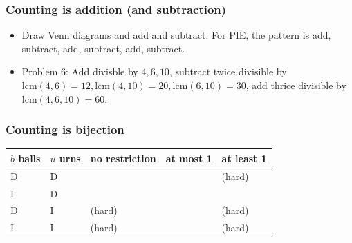 \documentclass[10pt,paper=letter]{scrartcl}
\begin{document}
\subsubsection*{Counting is addition (and subtraction)}

\begin{itemize}
  \item Draw Venn diagrams and add and subtract. For PIE, the pattern is add, subtract, add, subtract, add, subtract. 
  \item Problem 6: Add divisble by $4, 6, 10$, subtract twice divisible by $\text{lcm}(4, 6) = 12, \text{lcm}(4, 10) = 20, \text{lcm}(6, 10) = 30$, add thrice divisible by $\text{lcm}(4, 6, 10) = 60$.
\end{itemize}

\subsubsection*{Counting is bijection}

\begin{center}
\def\arraystretch{2}
  \begin{tabular}{l|l|l|l|l}
    $b$ balls & $u$ urns & no restriction & at most 1 & at least 1 \\ \hline
    D & D & & & (hard) \\ \hline
    I & D & & & \\ \hline
    D & I & (hard) & & (hard) \\ \hline
    I & I & (hard) & & (hard)
  \end{tabular}
\end{center}
\end{document}
